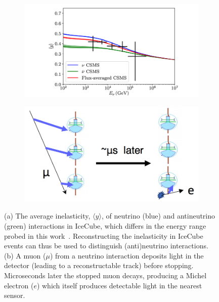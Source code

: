 \documentclass[a4paper,11pt]{article}
\begin{document}
\begin{figure}
    \begin{subfigure}[b]{0.5\textwidth}
    \centering
    \includegraphics[trim=2.0cm 0.0cm 1.0cm 0.0cm, clip=true, width=\linewidth]{images/inelasticity.png}
    \caption{\label{fig:inelasticity}}
    \end{subfigure}
    \begin{subfigure}[b]{0.5\textwidth}
    \centering
    \includegraphics[trim=0.0cm 0.0cm 0.0cm 0.0cm, clip=true, width=\linewidth]{images/michel_electron.png}
    \caption{\label{fig:michel_electron}}
    \end{subfigure}
    \caption{(a) The average inelasticity, $\langle y \rangle$, of neutrino (blue) and antineutrino (green) interactions in IceCube, which differs in the energy range probed in this work~\cite{Aartsen:2018vez}. Reconstructing the inelasticity in IceCube events can thus be used to distinguish (anti)neutrino interactions. (b) A muon ($\mu$) from a neutrino interaction deposits light in the detector (leading to a reconstructable track) before stopping. Microseconds later the stopped muon decays, producing a Michel electron ($e$) which itself produces detectable light in the nearest sensor.}
    \vspace{-7pt}
\end{figure}
\end{document}

